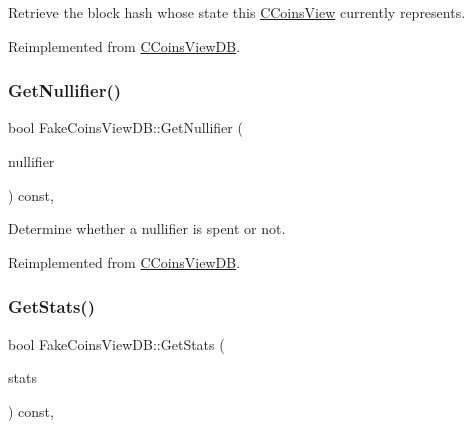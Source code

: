 Retrieve the block hash whose state this \mbox{\hyperlink{class_c_coins_view}{C\+Coins\+View}} currently represents. 



Reimplemented from \mbox{\hyperlink{class_c_coins_view_d_b_ac9c513a34b9e58d942fdbeafd9e5bbce}{C\+Coins\+View\+DB}}.

\mbox{\label{class_fake_coins_view_d_b_af7d0ce4926fb03ee632148c5fde66c05}} 
\subsubsection{\texorpdfstring{Get\+Nullifier()}{GetNullifier()}}
{\footnotesize\ttfamily bool Fake\+Coins\+View\+D\+B\+::\+Get\+Nullifier (\begin{DoxyParamCaption}\item[{const \mbox{\hyperlink{classuint256}{uint256}} \&}]{nullifier }\end{DoxyParamCaption}) const\hspace{0.3cm}{\ttfamily [inline]}, {\ttfamily [virtual]}}



Determine whether a nullifier is spent or not. 



Reimplemented from \mbox{\hyperlink{class_c_coins_view_d_b_ac9724829164f5a06b6d7c610da03a730}{C\+Coins\+View\+DB}}.

\mbox{\label{class_fake_coins_view_d_b_ad1deefbe955925e274e5d50d289275e9}} 
\subsubsection{\texorpdfstring{Get\+Stats()}{GetStats()}}
{\footnotesize\ttfamily bool Fake\+Coins\+View\+D\+B\+::\+Get\+Stats (\begin{DoxyParamCaption}\item[{\mbox{\hyperlink{struct_c_coins_stats}{C\+Coins\+Stats}} \&}]{stats }\end{DoxyParamCaption}) const\hspace{0.3cm}{\ttfamily [inline]}, {\ttfamily [virtual]}}



